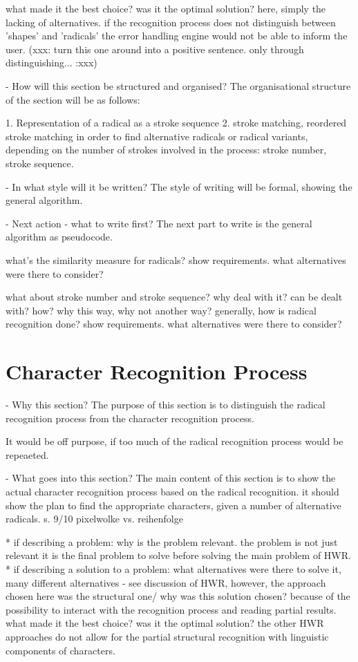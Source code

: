     what made it the best choice? was it the optimal solution?
    here, simply the lacking of alternatives. if the recognition process
    does not distinguish between 'shapes' and 'radicals' the error
    handling engine would not be able to inform the user.
    (xxx: turn this one around into a positive sentence. 
    only through distinguishing... :xxx)
    
- How will this section be structured and organised?
  The organisational structure of the section will be as follows:

    1. Representation of a radical as a stroke sequence
    2. stroke matching, reordered stroke matching in order to find 
       alternative radicals or radical variants, depending on the 
       number of strokes involved in the process: stroke number, stroke sequence.

- In what style will it be written?
  The style of writing will be formal, showing the general algorithm.

- Next action - what to write first?
  The next part to write is the general algorithm as pseudocode.

what's the similarity measure for
radicals?
show requirements.
what alternatives were there to consider?

what about stroke number and stroke sequence?
why deal with it? can be dealt with? 
how? why this way, why not another way?
generally, how is radical recognition done?
show requirements.
what alternatives were there to consider?

\section{Character Recognition Process}
\label{sec:hwre:characterrecognitionprocess}

- Why this section? 
  The purpose of this section is to distinguish the radical recognition process
  from the character recognition process.
  
  It would be off purpose, if too much of the radical recognition process would
  be repeaeted. 

- What goes into this section?
  The main content of this section is to show the actual character recognition
  process based on the radical recognition. 
  it should show the plan to find the appropriate characters, given a number of
  alternative radicals.
  s. 9/10 pixelwolke vs. reihenfolge

  * if describing a problem: why is the problem relevant.
    the problem is not just relevant it is the final problem to solve
    before solving the main problem of HWR.
  * if describing a solution to a problem: what alternatives were
    there to solve it, 
    many different alternatives - see discussion of HWR, however,
    the approach chosen here was the structural one/
    why was this solution chosen? 
    because of the possibility to interact with the recognition process
    and reading partial results.
    what made it the best choice? was it the optimal solution?
    the other HWR approaches do not allow for the partial structural recognition
    with linguistic components of characters.

